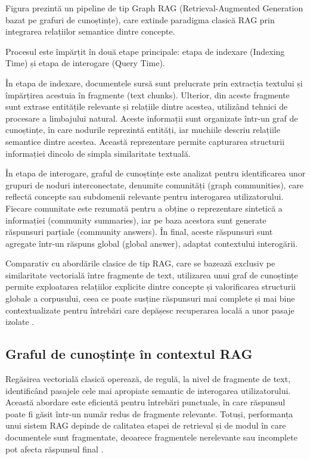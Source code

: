 \documentclass[12pt, a4paper, oneside, romanian]{teza-upb}
\begin{document}
Figura prezintă un pipeline de tip Graph RAG (Retrieval-Augmented Generation bazat pe grafuri de cunoștințe), care extinde paradigma clasică RAG prin integrarea relațiilor semantice dintre concepte.

Procesul este împărțit în două etape principale: etapa de indexare (Indexing Time) și etapa de interogare (Query Time).

În etapa de indexare, documentele sursă sunt prelucrate prin extracția textului și împărțirea acestuia în fragmente (text chunks). Ulterior, din aceste fragmente sunt extrase entitățile relevante și relațiile dintre acestea, utilizând tehnici de procesare a limbajului natural. Aceste informații sunt organizate într-un graf de cunoștințe, în care nodurile reprezintă entități, iar muchiile descriu relațiile semantice dintre acestea. Această reprezentare permite capturarea structurii informației dincolo de simpla similaritate textuală.

În etapa de interogare, graful de cunoștințe este analizat pentru identificarea unor grupuri de noduri interconectate, denumite comunități (graph communities), care reflectă concepte sau subdomenii relevante pentru interogarea utilizatorului. Fiecare comunitate este rezumată pentru a obține o reprezentare sintetică a informației (community summaries), iar pe baza acestora sunt generate răspunsuri parțiale (community answers). În final, aceste răspunsuri sunt agregate într-un răspuns global (global answer), adaptat contextului interogării.

Comparativ cu abordările clasice de tip RAG, care se bazează exclusiv pe similaritate vectorială între fragmente de text, utilizarea unui graf de cunoștințe permite exploatarea relațiilor explicite dintre concepte și valorificarea structurii globale a corpusului, ceea ce poate susține răspunsuri mai complete și mai bine contextualizate pentru întrebări care depășesc recuperarea locală a unor pasaje izolate \cite{edge2024local}.
\subsection{Graful de cunoștințe în contextul RAG}

Regăsirea vectorială clasică operează, de regulă, la nivel de fragmente de text, identificând pasajele cele mai apropiate semantic de interogarea utilizatorului. Această abordare este eficientă pentru întrebări punctuale, în care răspunsul poate fi găsit într-un număr redus de fragmente relevante. Totuși, performanța unui sistem RAG depinde de calitatea etapei de retrieval și de modul în care documentele sunt fragmentate, deoarece fragmentele nerelevante sau incomplete pot afecta răspunsul final \cite{gao2023retrieval}.
\end{document}
